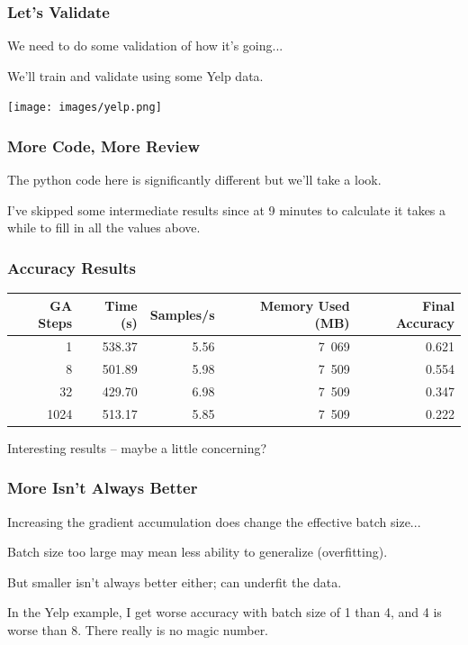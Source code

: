 \begin{frame}
\frametitle{Let's Validate}

We need to do some validation of how it's going...


We'll train and validate using some Yelp data.

\begin{center}
	\texttt{[image: images/yelp.png]}
\end{center}

\end{frame}

\begin{frame}
\frametitle{More Code, More Review}

The python code here is significantly different but we'll take a look.

I've skipped some intermediate results since at 9 minutes to calculate it takes a while to fill in all the values above.


\end{frame}

\begin{frame}
\frametitle{Accuracy Results}

\begin{center}
\begin{tabular}{r|r|r|r|r}
\textbf{GA Steps} & \textbf{Time (s)} & \textbf{Samples/s} & \textbf{Memory Used (MB)} & \textbf{Final Accuracy}\\ \hline
1 & 538.37 & 5.56 & 7~069 & 0.621 \\
8 & 501.89 & 5.98 & 7~509 & 0.554 \\
32 & 429.70 & 6.98 & 7~509 & 0.347 \\
1024 & 513.17 & 5.85 & 7~509 & 0.222 \\
\end{tabular}
\end{center}

Interesting results -- maybe a little concerning?

\end{frame}

\begin{frame}
\frametitle{More Isn't Always Better}

Increasing the gradient accumulation does change the effective batch size...

Batch size too large may mean less ability to generalize (overfitting).

But smaller isn't always better either; can underfit the data.

In the Yelp example, I get worse accuracy with batch size of 1 than 4, and 4 is worse than 8. There really is no magic number.


\end{frame}


